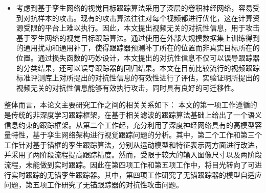 \begin{itemize}
\item 考虑到基于孪生网络的视觉目标跟踪算法采用了深层的卷积神经网络，容易受到对抗样本的攻击。现有的攻击算法往往对每个视频都进行优化，这在计算资源受限的平台上难以执行。因此，本文提出视频无关的对抗性信息，用于攻击基于孪生网络的视觉目标跟踪算法。通过使用在外部大规模数据集上训练得到的通用扰动和通用补丁，使得跟踪器预测补丁所在的位置而非真实目标所在的位置。通过损失函数的巧妙设计，本文提出的对抗性信息不仅可以误导跟踪器的分类结果，还可以误导跟踪器的回归结果。本文在目前比较流行的视频跟踪标准评测库上对所提出的对抗性信息的有效性进行了评估，实验证明所提出的视频无关的对抗性信息能够有效执行攻击，同时具有良好的可迁移性。
\end{itemize}

整体而言，本论文主要研究工作之间的相关关系如下：
本文的第一项工作遵循的是传统的非深度学习跟踪框架，在基于相关滤波的跟踪算法基础上给出了一个语义信息约束的跟踪框架。从第二个工作起，充分利用了深度神经网络具有的高模型容量特性，基于孪生网络架构进行视觉跟踪问题的分析。其中，第二个工作和第三个工作针对基于锚框的孪生跟踪算法，分别从运动模型和特征表示两方面进行改进，并采用了两阶段流程提高跟踪精度。然而，受限于较大的输入图像尺寸以及两阶段流程，未能做到实时跟踪。因此在第四项工作和第五项工作中，将目光转向了可进行实时跟踪的无锚孪生跟踪器。其中，第四项工作研究了无锚跟踪器的模型自适应问题，第五项工作研究了无锚跟踪器的对抗性攻击问题。

